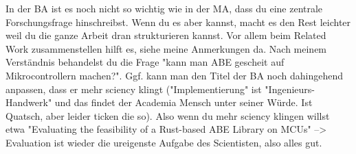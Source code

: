 In der BA ist es noch nicht so wichtig wie in der MA, dass du eine zentrale Forschungsfrage hinschreibst. Wenn du es aber kannst, macht es den Rest leichter weil du die ganze Arbeit dran strukturieren kannst. Vor allem beim Related Work zusammenstellen hilft es, siehe meine Anmerkungen da. 
Nach meinem Verständnis behandelst du die Frage "kann man ABE gescheit auf Mikrocontrollern machen?". Ggf. kann man den Titel der BA noch dahingehend anpassen, dass er mehr sciency klingt ("Implementierung" ist "Ingenieurs-Handwerk" und das findet der Academia Mensch unter seiner Würde. Ist Quatsch, aber leider ticken die so). Also wenn du mehr sciency klingen willst etwa "Evaluating the feasibility of a Rust-based ABE Library on MCUs" --> Evaluation ist wieder die ureigenste Aufgabe des Scientisten, also alles gut.








